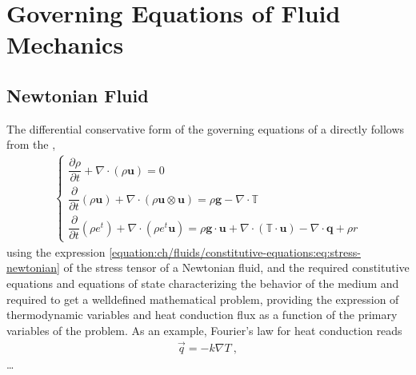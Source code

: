 \documentclass[letterpaper,10pt,english]{jupyterBook}
\begin{document}
\sphinxstepscope


\chapter{Governing Equations of Fluid Mechanics}
\label{\detokenize{ch/fluids/governing-equations:governing-equations-of-fluid-mechanics}}\label{\detokenize{ch/fluids/governing-equations:fluid-mechanics-governing-equations}}\label{\detokenize{ch/fluids/governing-equations::doc}}

\section{Newtonian Fluid}
\label{\detokenize{ch/fluids/governing-equations:newtonian-fluid}}
\sphinxAtStartPar
The differential conservative form of the governing equations of a {\hyperref[\detokenize{ch/fluids/constitutive-equations:fluid-mechanics-constutive-equations-newtonian}]{}} directly follows from the ,
\begin{equation*}
\begin{split}\begin{cases}
  \dfrac{\partial \rho }{\partial t} + \nabla \cdot \left( \rho \mathbf{u} \right) = 0 \\
  \dfrac{\partial }{\partial t} \left( \rho \mathbf{u} \right) +  \nabla \cdot \left( \rho \mathbf{u} \otimes \mathbf{u} \right) = \rho \mathbf{g} - \nabla \cdot \mathbb{T} \\
  \dfrac{\partial}{\partial t}  \left( \rho e^t \right) + \nabla \cdot \left( \rho e^t \mathbf{u} \right) = \rho \mathbf{g} \cdot \mathbf{u} + \nabla \cdot \left( \mathbb{T} \cdot \mathbf{u} \right) - \nabla \cdot \mathbf{q} + \rho r
\end{cases}\end{split}
\end{equation*}
\sphinxAtStartPar
using the expression \eqref{equation:ch/fluids/constitutive-equations:eq:stress-newtonian} of the stress tensor of a Newtonian fluid, and the required constitutive equations and equations of state characterizing the behavior of the medium and required to get a well\sphinxhyphen{}defined mathematical problem, providing the expression of thermodynamic variables and heat conduction flux as a function of the primary variables of the problem. As an example, Fourier’s law for heat conduction reads
\begin{equation*}
\begin{split}\vec{q} = - k \nabla T \ ,\end{split}
\end{equation*}
\sphinxAtStartPar
…
\end{document}
